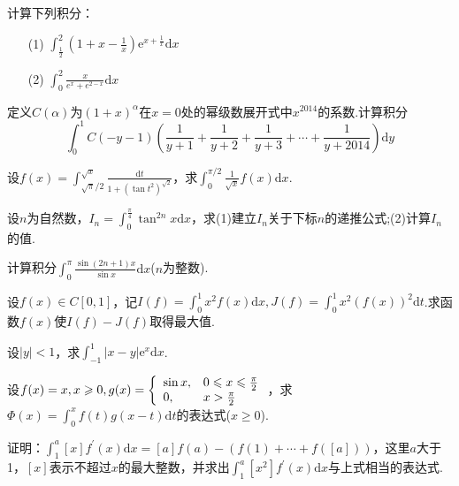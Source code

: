 \begin{xiti}
\begin{enumerate}
	\end{enumerate}
\item 计算下列积分：
\begin{enumerate}
	\item [(1)]$\int _ { \frac { 1 } { 2 } } ^ { 2 } \left( 1 + x - \frac { 1 } { x } \right) \mathrm { e } ^ { x + \frac { 1 } { x } } \mathrm { d } x$
	\item [(2)]$\int _ { 0 } ^ { 2 } \frac { x } { e ^ { x } + e ^ { 2 - x } }\mathrm { d } x$
\end{enumerate}
\item 定义$C(\alpha)$为$(1+x)^{\alpha}$在$x=0$处的幂级数展开式中$x^{2014}$的系数.计算积分
\[\int _ { 0 } ^ { 1 } C ( - y - 1 ) \left( \frac { 1 } { y + 1 } + \frac { 1 } { y + 2 } + \frac { 1 } { y + 3 } + \cdots + \frac { 1 } { y + 2014 } \right) \mathrm { d } y\]
\item 设$f ( x ) = \int _ { \sqrt { \pi } / 2 } ^ { \sqrt { x } } \frac { \mathrm { d } t } { 1 + \left( \tan t ^ { 2 } \right) ^ { \sqrt { 2 } } }$，求$\int _ { 0 } ^ { \pi / 2 } \frac { 1 } { \sqrt { x } } f ( x ) \mathrm { d } x$.
\item 设$n$为自然数，$I _ { n } = \int _ { 0 } ^ { \frac { \pi } { 4 } } \tan ^ { 2 n } x \mathrm { d } x$，求(1)建立$I_{n}$关于下标$n$的递推公式;(2)计算$I_{n}$的值.
\item 计算积分$\int _ { 0 } ^ { \pi } \frac { \sin ( 2 n + 1 ) x } { \sin x } \mathrm { d } x$\quad ($n$为整数).
\item 设$f ( x ) \in C [ 0,1 ]$，记$I ( f ) = \int _ { 0 } ^ { 1 } x ^ { 2 } f ( x ) \mathrm { d } x , J ( f ) = \int _ { 0 } ^ { 1 } x ^ { 2 } ( f ( x ) ) ^ { 2 } \mathrm { d } t$.求函数$f(x)$使$I ( f ) - J ( f )$取得最大值.
\item 设$|y|<1$，求$\int _ { - 1 } ^ { 1 } | x - y | \mathrm { e } ^ { x } \mathrm { d } x$.
\item 设$f ( x ) = x , x \geqslant 0 , g ( x ) = \left\{ \begin{array} { l l } { \sin x , } & { 0 \leqslant x \leqslant \frac { \pi } { 2 } } \\ { 0 , } & { x > \frac { \pi } { 2 } } \end{array} \right.$，求$\Phi ( x ) = \int _ { 0 } ^ { x } f ( t ) g ( x - t ) \mathrm { d } t$的表达式($x\geq 0$).
\item 证明：$\int _ { 1 } ^ { a } [ x ] f ^ { \prime } ( x ) \mathrm { d } x = [ a ] f ( a ) - ( f ( 1 ) + \cdots + f ( [ a ] ) )$，这里$a$大于1，$[x]$表示不超过$x$的最大整数，并求出$\int _ { 1 } ^ { a } \left[ x ^ { 2 } \right] f ^ { \prime } ( x ) \mathrm { d } x$与上式相当的表达式.

\end{xiti}
